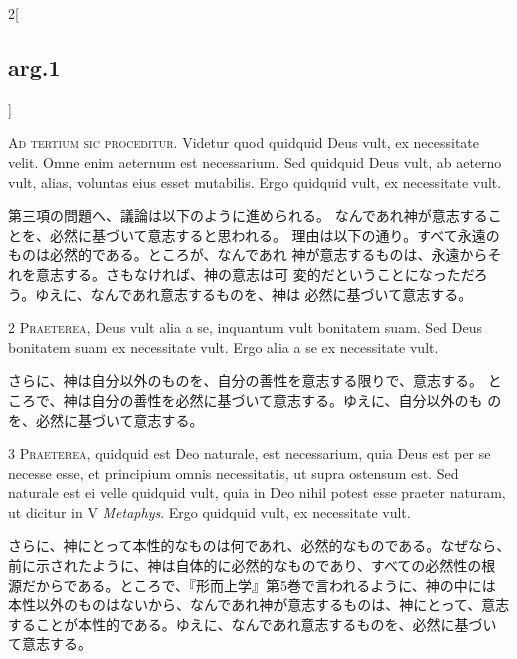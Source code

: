 \documentclass[paper=a4paper,fontsize=10pt,jafontsize=9pt,titlepage]{jlreq}
\begin{document}
\begin{paracol}{2}[\subsection{arg.1}]


{\huge A}{\scshape d tertium sic proceditur}. Videtur quod
quidquid Deus vult, ex necessitate velit. Omne enim aeternum est
necessarium. Sed quidquid Deus vult, ab aeterno vult, alias, voluntas
eius esset mutabilis. Ergo quidquid vult, ex necessitate vult.

\switchcolumn

第三項の問題へ、議論は以下のように進められる。
なんであれ神が意志することを、必然に基づいて意志すると思われる。
 理由は以下の通り。すべて永遠のものは必然的である。ところが、なんであれ
 神が意志するものは、永遠からそれを意志する。さもなければ、神の意志は可
 変的だということになっただろう。ゆえに、なんであれ意志するものを、神は
 必然に基づいて意志する。



{\scshape 2 Praeterea}, Deus vult alia a se, inquantum
vult bonitatem suam. Sed Deus bonitatem suam ex necessitate vult. Ergo
alia a se ex necessitate vult.

\switchcolumn

さらに、神は自分以外のものを、自分の善性を意志する限りで、意志する。
 ところで、神は自分の善性を必然に基づいて意志する。ゆえに、自分以外のも
 のを、必然に基づいて意志する。



{\scshape 3 Praeterea}, quidquid est Deo naturale, est
necessarium, quia Deus est per se necesse esse, et principium omnis
necessitatis, ut supra ostensum est. Sed naturale est ei velle quidquid
vult, quia in Deo nihil potest esse praeter naturam, ut dicitur in V
{\itshape Metaphys}. Ergo quidquid vult, ex necessitate vult.

\switchcolumn

さらに、神にとって本性的なものは何であれ、必然的なものである。なぜなら、
 前に示されたように、神は自体的に必然的なものであり、すべての必然性の根
 源だからである。ところで、『形而上学』第5巻で言われるように、神の中には
 本性以外のものはないから、なんであれ神が意志するものは、神にとって、意志
 することが本性的である。ゆえに、なんであれ意志するものを、必然に基づい
 て意志する。


\end{paracol}
\end{document}
